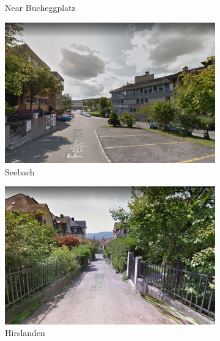 \documentclass[letterpaper]{article}
\begin{document}
\begin{figure}[H]
\begin{subfigure}[t]{.45\columnwidth}
        \caption[width=.9\linewidth]{Near Bucheggplatz}
    \end{subfigure}\vspace{1mm}
    \begin{subfigure}[t]{.45\columnwidth}
        \centering
        \includegraphics[width=\linewidth]{images/good/seebach.png}
        \caption[width=.9\linewidth]{Seebach}
    \end{subfigure}\hspace{0.05\columnwidth}
    \begin{subfigure}[t]{.45\columnwidth}
        \centering
        \includegraphics[width=\linewidth]{images/good/hirslanden.png}
        \caption[width=.9\linewidth]{Hirslanden}
    \end{subfigure}\vspace{1mm}
    \begin{subfigure}[t]{.45\columnwidth}
        \centering

\end{subfigure}
\end{figure}
\end{document}
